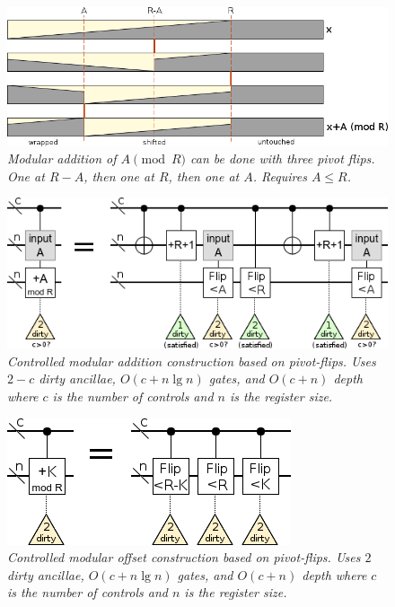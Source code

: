 \documentclass[twocolumn]{article}
\begin{document}
\begin{figure}
  \centering
  \includegraphics[width=\linewidth]{assets/mod-add-from-pivot-flip-bars.png}
  \caption{\em
     Modular addition of $A \pmod{R}$ can be done with three pivot flips.
     One at $R-A$, then one at $R$, then one at $A$.
     Requires $A \leq R$.
   }
  \label{fig:mod-add-from-pivot-flip-bars}
\end{figure}

\begin{figure}
  \centering
  \includegraphics[width=\linewidth]{assets/controlled-modular-addition.png}
  \caption{\em
    Controlled modular addition construction based on pivot-flips.
    Uses $2-c$ dirty ancillae, $O(c + n \lg n)$ gates, and $O(c + n)$ depth where $c$ is the number of controls and $n$ is the register size.
  }
  \label{fig:controlled-modular-add}
\end{figure}

\begin{figure}
  \centering
  \includegraphics[width=\linewidth]{assets/controlled-modular-offset.png}
  \caption{\em
    Controlled modular offset construction based on pivot-flips.
    Uses $2$ dirty ancillae, $O(c + n \lg n)$ gates, and $O(c + n)$ depth where $c$ is the number of controls and $n$ is the register size.
  }
  \label{fig:controlled-modular-offset}
\end{figure}
\end{document}
